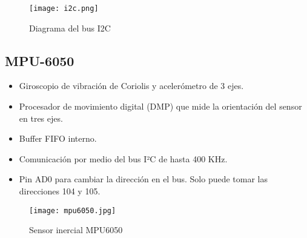 \begin{figure}[htb]
	\centering
	\texttt{[image: i2c.png]}
	\caption{Diagrama del bus I2C}
\end{figure}

\subsection*{MPU-6050}
\begin{itemize}
	\item Giroscopio de vibración de Coriolis y acelerómetro de 3 ejes.
	\item Procesador de movimiento digital (DMP) que mide la orientación del sensor en tres ejes.
	\item Buffer FIFO interno.
	\item Comunicación por medio del bus I²C de hasta 400 KHz.
	\item Pin AD0 para cambiar la dirección en el bus. Solo puede tomar las direcciones 104 y 105.
\end{itemize}

\begin{figure}[htb]
	\centering
	\texttt{[image: mpu6050.jpg]}
	\caption{Sensor inercial MPU6050}
\end{figure}




